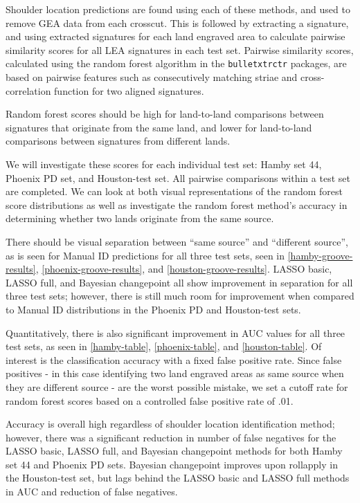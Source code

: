 \documentclass[12pt]{article}
\begin{document}
Shoulder location predictions are found using each of these methods, and
used to remove GEA data from each crosscut. This is followed by
extracting a signature, and using extracted signatures for each land
engraved area to calculate pairwise similarity scores for all LEA
signatures in each test set. Pairwise similarity scores, calculated
using the random forest algorithm in the \texttt{bulletxtrctr} packages,
are based on pairwise features such as consecutively matching striae and
cross-correlation function for two aligned signatures.

Random forest scores should be high for land-to-land comparisons between
signatures that originate from the same land, and lower for land-to-land
comparisons between signatures from different lands.

We will investigate these scores for each individual test set: Hamby set
44, Phoenix PD set, and Houston-test set. All pairwise comparisons
within a test set are completed. We can look at both visual
representations of the random forest score distributions as well as
investigate the random forest method's accuracy in determining whether
two lands originate from the same source.

There should be visual separation between ``same source'' and
``different source'', as is seen for Manual ID predictions for all three
test sets, seen in \autoref{hamby-groove-results},
\autoref{phoenix-groove-results}, and \autoref{houston-groove-results}.
LASSO basic, LASSO full, and Bayesian changepoint all show improvement
in separation for all three test sets; however, there is still much room
for improvement when compared to Manual ID distributions in the Phoenix
PD and Houston-test sets.

Quantitatively, there is also significant improvement in AUC values for
all three test sets, as seen in \autoref{hamby-table},
\autoref{phoenix-table}, and \autoref{houston-table}. Of interest is the
classification accuracy with a fixed false positive rate. Since false
positives - in this case identifying two land engraved areas as same
source when they are different source - are the worst possible mistake,
we set a cutoff rate for random forest scores based on a controlled
false positive rate of .01.

Accuracy is overall high regardless of shoulder location identification
method; however, there was a significant reduction in number of false
negatives for the LASSO basic, LASSO full, and Bayesian changepoint
methods for both Hamby set 44 and Phoenix PD sets. Bayesian changepoint
improves upon rollapply in the Houston-test set, but lags behind the
LASSO basic and LASSO full methods in AUC and reduction of false
negatives.
\end{document}
